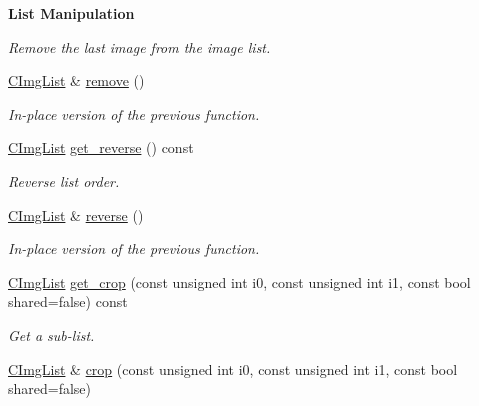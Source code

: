 \begin{Indent}{\bf List Manipulation}
\begin{DoxyCompactItemize}
\begin{DoxyCompactList}\small\item\em Remove the last image from the image list. \end{DoxyCompactList}\item 
\hypertarget{structcimg__library_1_1_c_img_list_aa6c7f18174af128b82297b0e30ffa520}{\hyperlink{structcimg__library_1_1_c_img_list}{C\-Img\-List} \& \hyperlink{structcimg__library_1_1_c_img_list_aa6c7f18174af128b82297b0e30ffa520}{remove} ()}\label{structcimg__library_1_1_c_img_list_aa6c7f18174af128b82297b0e30ffa520}

\begin{DoxyCompactList}\small\item\em In-\/place version of the previous function. \end{DoxyCompactList}\item 
\hypertarget{structcimg__library_1_1_c_img_list_a4b9074fe535eaee11ead1f801c8cd2fd}{\hyperlink{structcimg__library_1_1_c_img_list}{C\-Img\-List} \hyperlink{structcimg__library_1_1_c_img_list_a4b9074fe535eaee11ead1f801c8cd2fd}{get\-\_\-reverse} () const }\label{structcimg__library_1_1_c_img_list_a4b9074fe535eaee11ead1f801c8cd2fd}

\begin{DoxyCompactList}\small\item\em Reverse list order. \end{DoxyCompactList}\item 
\hypertarget{structcimg__library_1_1_c_img_list_a1a28d1f01c228d3e6acb2c672cf2ec2c}{\hyperlink{structcimg__library_1_1_c_img_list}{C\-Img\-List} \& \hyperlink{structcimg__library_1_1_c_img_list_a1a28d1f01c228d3e6acb2c672cf2ec2c}{reverse} ()}\label{structcimg__library_1_1_c_img_list_a1a28d1f01c228d3e6acb2c672cf2ec2c}

\begin{DoxyCompactList}\small\item\em In-\/place version of the previous function. \end{DoxyCompactList}\item 
\hypertarget{structcimg__library_1_1_c_img_list_a546812dd7c53b013c5b2846d06b2e8e8}{\hyperlink{structcimg__library_1_1_c_img_list}{C\-Img\-List} \hyperlink{structcimg__library_1_1_c_img_list_a546812dd7c53b013c5b2846d06b2e8e8}{get\-\_\-crop} (const unsigned int i0, const unsigned int i1, const bool shared=false) const }\label{structcimg__library_1_1_c_img_list_a546812dd7c53b013c5b2846d06b2e8e8}

\begin{DoxyCompactList}\small\item\em Get a sub-\/list. \end{DoxyCompactList}\item 
\hypertarget{structcimg__library_1_1_c_img_list_a625b4a9c8940a92a22b43ddd3ea4ee0a}{\hyperlink{structcimg__library_1_1_c_img_list}{C\-Img\-List} \& \hyperlink{structcimg__library_1_1_c_img_list_a625b4a9c8940a92a22b43ddd3ea4ee0a}{crop} (const unsigned int i0, const unsigned int i1, const bool shared=false)}\label{structcimg__library_1_1_c_img_list_a625b4a9c8940a92a22b43ddd3ea4ee0a}


\end{DoxyCompactItemize}
\end{Indent}
